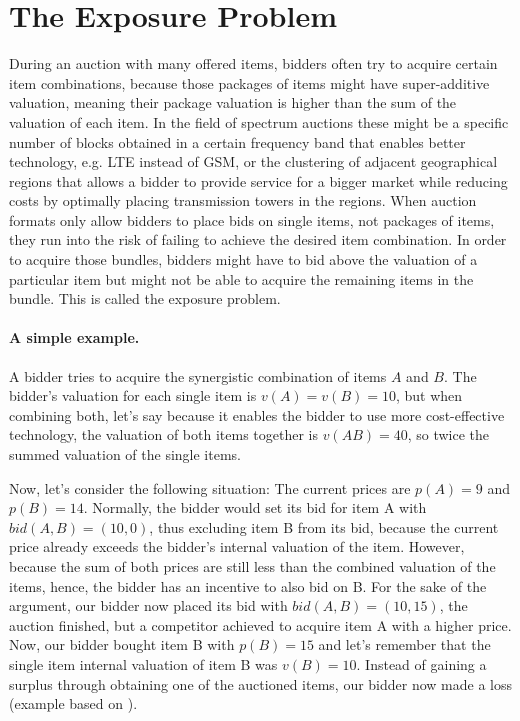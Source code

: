 \section{The Exposure Problem}\label{subsection:exposure-problem}
During an auction with many offered items, bidders often try to acquire certain item combinations, because those packages of items might have super-additive valuation, meaning their package valuation is higher than the sum of the valuation of each item. In the field of spectrum auctions these might be a specific number of blocks obtained in a certain frequency band that enables better technology, e.g. LTE instead of GSM, or the clustering of adjacent geographical regions that allows a bidder to provide service for a bigger market while reducing costs by optimally placing transmission towers in the regions.
When auction formats only allow bidders to place bids on single items, not packages of items, they run into the risk of failing to achieve the desired item combination. In order to acquire those bundles, bidders might have to bid above the valuation of a particular item but might not be able to acquire the remaining items in the bundle. This is called the exposure problem.


\paragraph{A simple example.} A bidder tries to acquire the synergistic combination of items $ A $ and $ B $. The bidder's valuation for each single item is $ v(A) = v(B) = 10 $, but when combining both, let's say because it enables the bidder to use more cost-effective technology, the valuation of both items together is $ v(AB) = 40 $, so twice the summed valuation of the single items. 

Now, let's consider the following situation: The current prices are $ p(A) = 9 $ and $ p(B) = 14 $. Normally, the bidder would set its bid for item A with $ bid(A, B) = (10, 0) $, thus excluding item B from its bid, because the current price already exceeds the bidder's internal valuation of the item. However, because the sum of both prices are still less than the combined valuation of the items, hence, the bidder has an incentive to also bid on B. For the sake of the argument, our bidder now placed its bid with $ bid(A, B) = (10, 15) $, the auction finished, but a competitor achieved to acquire item A with a higher price. Now, our bidder bought item B with $ p(B) = 15 $ and let's remember that the single item internal valuation of item B was $ v(B) = 10 $. Instead of gaining a surplus through obtaining one of the auctioned items, our bidder now made a loss (example based on \cite{Levin2009}).


